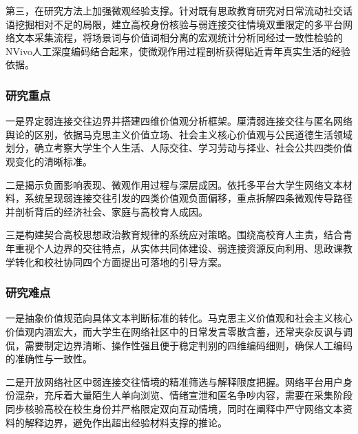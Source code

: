 第三，在研究方法上加强微观经验支撑。针对既有思政教育研究对日常流动社交话语挖掘相对不足的局限，建立高校身份核验与弱连接交往情境双重限定的多平台网络文本采集流程，将场景词与价值词相分离的宏观统计分析同经过一致性检验的NVivo人工深度编码结合起来，使微观作用过程剖析获得贴近青年真实生活的经验依据。

\subsubsection{研究重点}

一是界定弱连接交往边界并搭建四维价值观分析框架。厘清弱连接交往与匿名网络舆论的区别，依据马克思主义价值立场、社会主义核心价值观与公民道德生活领域划分，确立考察大学生个人生活、人际交往、学习劳动与择业、社会公共四类价值观变化的清晰标准。

二是揭示负面影响表现、微观作用过程与深层成因。依托多平台大学生网络文本材料，系统呈现弱连接交往引发的四类价值观负面偏移，重点拆解四条微观传导路径并剖析背后的经济社会、家庭与高校育人成因。

三是构建契合高校思想政治教育规律的系统应对策略。围绕高校育人主责，结合青年重视个人边界的交往特点，从实体共同体建设、弱连接资源反向利用、思政课教学转化和校社协同四个方面提出可落地的引导方案。

\subsubsection{研究难点}

一是抽象价值规范向具体文本判断标准的转化。马克思主义价值观和社会主义核心价值观内涵宏大，而大学生在网络社区中的日常发言零散含蓄，还常夹杂反讽与调侃，需要制定边界清晰、操作性强且便于稳定判别的四维编码细则，确保人工编码的准确性与一致性。

二是开放网络社区中弱连接交往情境的精准筛选与解释限度把握。网络平台用户身份混杂，充斥着大量陌生人单向浏览、情绪宣泄和匿名争吵内容，需要在采集阶段同步核验高校在校生身份并严格限定双向互动情境，同时在阐释中严守网络文本资料的解释边界，避免作出超出经验材料支撑的推论。